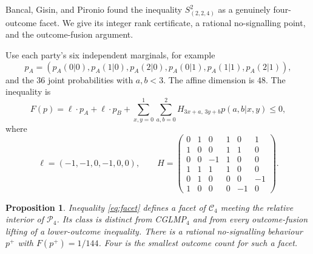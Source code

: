 \documentclass[11pt]{amsart}
\newtheorem{proposition}[theorem]{Proposition}
\theoremstyle{remark}
\theoremstyle{plain}
\numberwithin{equation}{section}
\newcommand{\Loc}{\mathcal C}
\newcommand{\NS}{\mathcal P}
\begin{document}
Bancal, Gisin, and Pironio \cite[Appendix B]{BGP} found the inequality
\(S^2_{(2,2,4)}\) as a genuinely four-outcome facet. We give its
integer rank certificate, a rational no-signalling point, and the
outcome-fusion argument.

Use each party's six independent marginals, for example
\[
 p_A=(p_A(0|0),p_A(1|0),p_A(2|0),
      p_A(0|1),p_A(1|1),p_A(2|1)),
\]
and the \(36\) joint probabilities with \(a,b<3\).
The affine dimension is \(48\). The inequality is
\begin{equation}\label{eq:facet}
 F(p)=\ell\cdot p_A+\ell\cdot p_B+
 \sum_{x,y=0}^1\sum_{a,b=0}^2
 H_{3x+a,\,3y+b}p(a,b|x,y)\le0,
\end{equation}
where
\[
 \ell=(-1,-1,0,-1,0,0),\qquad
 H=\begin{pmatrix}
 0&1&0&1&0&1\\
 1&0&0&1&1&0\\
 0&0&-1&1&0&0\\
 1&1&1&1&0&0\\
 0&1&0&0&0&-1\\
 1&0&0&0&-1&0
 \end{pmatrix}.
\]

\begin{proposition}\label{prop:bgp}
Inequality \eqref{eq:facet} defines a facet of \(\Loc_4\) meeting
the relative interior of \(\NS_4\). Its class is distinct from
CGLMP\(_4\) and from every outcome-fusion lifting of a lower-outcome
inequality. There is a rational no-signalling behaviour \(p^+\)
with \(F(p^+)=1/144\).
Four is the smallest outcome count for such a facet.
\end{proposition}
\end{document}
